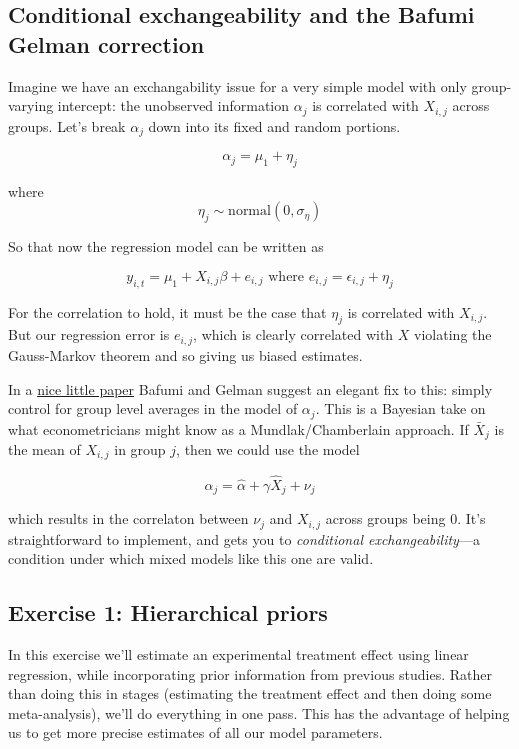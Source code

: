 \documentclass[]{book}
\begin{document}
\subsection{Conditional exchangeability and the Bafumi Gelman
correction}\label{conditional-exchangeability-and-the-bafumi-gelman-correction}

Imagine we have an exchangability issue for a very simple model with
only group-varying intercept: the unobserved information \(\alpha_{j}\)
is correlated with \(X_{i,j}\) across groups. Let's break \(\alpha_{j}\)
down into its fixed and random portions.

\[
\alpha_{j} = \mu_{1} + \eta_{j}
\]

where \[
\eta_{j} \sim \mbox{normal}(0, \sigma_{\eta})
\]

So that now the regression model can be written as

\[
y_{i,t} = \mu_{1}  + X_{i,j}\beta + e_{i,j} \mbox{ where } e_{i,j} = \epsilon_{i,j}+ \eta_{j}
\]

For the correlation to hold, it must be the case that \(\eta_{j}\) is
correlated with \(X_{i,j}\). But our regression error is \(e_{i,j}\),
which is clearly correlated with \(X\) violating the Gauss-Markov
theorem and so giving us biased estimates.

In a
\href{http://www.stat.columbia.edu/~gelman/research/unpublished/Bafumi_Gelman_Midwest06.pdf}{nice
little paper} Bafumi and Gelman suggest an elegant fix to this: simply
control for group level averages in the model of \(\alpha_{j}\). This is
a Bayesian take on what econometricians might know as a
Mundlak/Chamberlain approach. If \(\bar{X}_{j}\) is the mean of
\(X_{i,j}\) in group \(j\), then we could use the model

\[
\alpha_{j} = \hat{\alpha} + \gamma \hat{X}_{j} + \nu_{j}
\]

which results in the correlaton between \(\nu_{j}\) and \(X_{i,j}\)
across groups being 0. It's straightforward to implement, and gets you
to \emph{conditional exchangeability}---a condition under which mixed
models like this one are valid.

\subsection{Exercise 1: Hierarchical
priors}\label{exercise-1-hierarchical-priors}

In this exercise we'll estimate an experimental treatment effect using
linear regression, while incorporating prior information from previous
studies. Rather than doing this in stages (estimating the treatment
effect and then doing some meta-analysis), we'll do everything in one
pass. This has the advantage of helping us to get more precise estimates
of all our model parameters.
\end{document}

